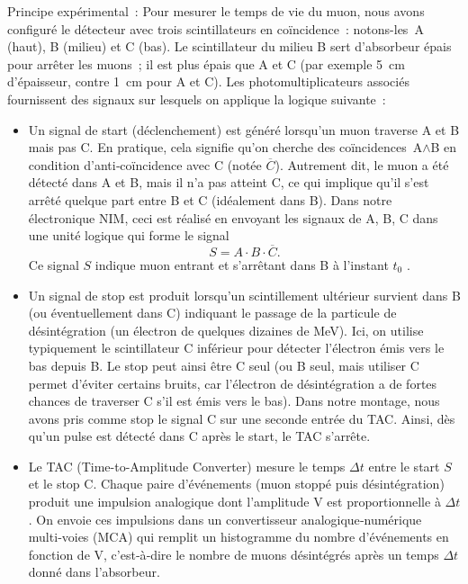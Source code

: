 \documentclass[a4paper,12pt,twoside]{article}
\begin{document}
Principe expérimental~: Pour mesurer le temps de vie du muon, nous avons configuré le détecteur avec trois scintillateurs en coïncidence~: notons-les~A (haut), B (milieu) et C (bas). Le scintillateur du milieu B sert d'absorbeur épais pour arrêter les muons~; il est plus épais que A et C (par exemple 5~cm d'épaisseur, contre 1~cm pour A et C). Les photomultiplicateurs associés fournissent des signaux sur lesquels on applique la logique suivante~:
\begin{itemize}
  \item Un signal de start (déclenchement) est généré lorsqu'un muon traverse A et B mais pas C. En pratique, cela signifie qu'on cherche des coïncidences~A\(\land\)B en condition d'anti‑coïncidence avec C (notée \(\overline{C}\)). Autrement dit, le muon a été détecté dans A et B, mais il n'a pas atteint C, ce qui implique qu'il s'est arrêté quelque part entre B et C (idéalement dans B). Dans notre électronique NIM, ceci est réalisé en envoyant les signaux de A, B, C dans une unité logique qui forme le signal
  \[
    S = A \cdot B \cdot \overline{C}.
  \]
  Ce signal \(S\) indique \og muon entrant et s'arrêtant dans B à l'instant \(t_0\) \fg{}.

  \item Un signal de stop est produit lorsqu'un scintillement ultérieur survient dans B (ou éventuellement dans C) indiquant le passage de la particule de désintégration (un électron de quelques dizaines de MeV). Ici, on utilise typiquement le scintillateur C inférieur pour détecter l'électron émis vers le bas depuis B. Le stop peut ainsi être C seul (ou B seul, mais utiliser C permet d'éviter certains bruits, car l'électron de désintégration a de fortes chances de traverser C s'il est émis vers le bas). Dans notre montage, nous avons pris comme stop le signal C sur une seconde entrée du TAC. Ainsi, dès qu'un pulse est détecté dans C après le start, le TAC s'arrête.

  \item Le TAC (Time-to-Amplitude Converter) mesure le temps \(\Delta t\) entre le start \(S\) et le stop C. Chaque paire d'événements (muon stoppé puis désintégration) produit une impulsion analogique dont l'amplitude V est proportionnelle à \(\Delta t\). On envoie ces impulsions dans un convertisseur analogique‑numérique multi‑voies (MCA) qui remplit un histogramme du nombre d’événements en fonction de V, c'est‑à‑dire le nombre de muons désintégrés après un temps \(\Delta t\) donné dans l'absorbeur.
\end{itemize}
\end{document}
